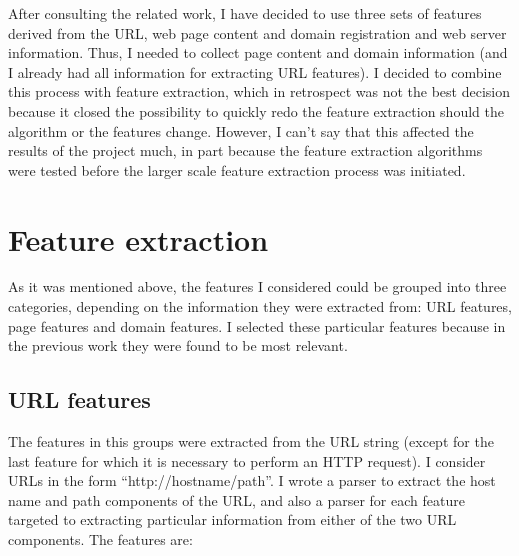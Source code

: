 \documentclass{article}
\begin{document}
After consulting the related work, I have decided to use three sets of
features derived from the URL, web page content and domain
registration and web server information. Thus, I needed to collect
page content and domain information (and I already had all information
for extracting URL features). I decided to combine this process with
feature extraction, which in retrospect was not the best decision
because it closed the possibility to quickly redo the feature
extraction should the algorithm or the features change. However, I
can't say that this affected the results of the project much, in part
because the feature extraction algorithms were tested before the
larger scale feature extraction process was initiated.

\section{Feature extraction}
\label{sec:feature-extraction}

As it was mentioned above, the features I considered could be grouped
into three categories, depending on the information they were
extracted from: URL features, page features and domain features. I
selected these particular features because in the previous work they
were found to be most relevant.

\subsection{URL features}
\label{sec:url-features}

The features in this groups were extracted from the URL string (except
for the last feature for which it is necessary to perform an HTTP
request). I consider URLs in the form ``http://hostname/path''. I
wrote a parser to extract the host name and path components of the
URL, and also a parser for each feature targeted to extracting
particular information from either of the two URL components. The
features are:
\end{document}
